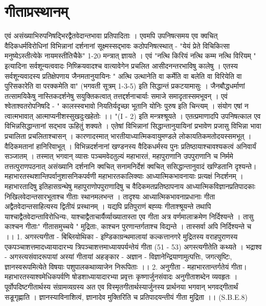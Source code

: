 \chapter{गीताप्रस्थानम् }
एवं असंख्याभिरुपनिषद्भिरद्वैतवेदान्तभावा प्रतिपादिताः । एवमपि उपनिषत्समय एव क्वचित् वैदिकधर्मविरोधिनां विभिन्नानां दर्शनानां सूक्ष्मस्सद्भावः कठोपनिषत्स्थात् - "येयं प्रेते विचिकित्सा मनुष्येऽस्तीत्येके नायमस्तीतिचैके" 1-20 मन्त्रात् ज्ञायते । एवं "नत्थि किरियं नत्थि कम्म नत्थि विरियम् " इत्यादिना सर्वशून्यत्ववादः निष्क्रियवादश्च वात्यावेगेन प्रचलित आसीदनन्तरभाविषु कालेषु । एतस्य सर्वशून्यवादस्य प्रतिक्षेपणाय जैनमतानुयायिनः " अत्थि उत्थानेति वा कर्मेति वा बलेति वा विरियेति वा पुरिसकारेति वा परक्कमेति वा" (भगवती सूत्रम् 1-3-5) इति सिद्धान्तं प्रकटयामासुः । जैनबौद्धधर्माणां तत्सामयिकेेषु नास्तिकदर्शनेषु सयुक्तिकत्वात् तत्तद्दर्शनाचार्याः समाजे समादृतास्समभूवन् । एवं श्वेताश्वतरोपनिषदि - 
" कालस्स्वभावो नियतिर्यदृच्छा भूतानि योनिः पुरुष इति चिन्त्यम् ।
संयोग एषां न त्वात्मभावात् आत्माप्यनीशस्सुखदुःखहेतोः ।। "(I - 2)
इति मन्त्रश्श्रूयते । एतत्प्रमाणादपि उपनिषत्काल एव विभिन्नसिद्धान्तानां सद्भाव ऊहितुं शक्यते । एतेषां विभिन्नानां सिद्धान्तानुयायिनां प्रभावेण प्रजासु विभिन्ना भावा प्रचालिता प्रचलिताश्चासन् । कारणादस्मात् भारतीयाध्यात्मिकवायुमण्डले लोकायतिकमतोदयस्समभूत् । वैदिकमतानां हानिरिवाभूत् । विभिन्नदर्शनानां खण्डनस्य वैदिकधर्मस्य पुनः प्रतिष्ठायाश्चावश्यकत्वं अनिवार्यं सञ्जातम् । तस्मात् भगवान् व्यासः पञ्चमवेदतुल्यं महाभारतं, महापुराणानि उपपुराणानि च निर्ममे तत्तत्पुराणपठनात् असंख्यानि दर्शनानि क्वचित् सनामनिर्देशं क्वचित् ससिद्धान्तानुवादं खण्डितानि दृश्यन्ते। महाभारतस्थशान्तिपर्वानुशासनिकपर्वणी महाभारतकालिक्याः आध्यात्मिकभावनायाः प्रत्यक्षं निदर्शनम् । महाभारतादिषु इतिहासग्रन्थेषु महापुराणोपपुराणादिषु च वैदिकमतप्रतिष्ठापनाय आध्यात्मिकविज्ञानप्रतिपादकाः निखिलवेदान्तसारभूताश्च गीताः स्थानमलभन्त । तादृश्यः आध्यात्मिकभावनाप्रधानाः गीता अद्वैतवेदान्तसाहित्यस्य द्वितीयं प्रस्थानम् । यद्यपि प्रतिपुराणं बह्व्यः गीताश्श्रूयन्ते तथापि याश्चाद्वैतवेदान्ताविरोधिन्यः, याश्चाद्वैताचार्यैर्व्याख्यातास्ता एव गीता अत्र वर्णमालाक्रमेण निर्दिश्यन्ते । तासु काश्चन गीताः" गीतासमुच्चये " मुद्रिताः, काश्चन पुरणान्तर्गताश्च विद्यन्ते । तास्सर्वा अपि निर्दिश्यन्ते च ।। 
1. अगस्त्यगीता - 
बिब्लियोथिका - इण्डिकाग्रन्थमालायां कल्कत्तानगरे मुद्रितस्य वराहपुराणस्य एकपञ्चाशत्तमादध्यायादारभ्य त्रिपञ्चाशत्तमाध्यायपर्यन्तेयं गीता (51 - 53) अगस्त्यगीतेति कथ्यते । 
भद्राश्व - अगस्त्यसंवादरूपायां अस्यां गीतायां अहङ्कार - अज्ञान - विज्ञानेन्द्रियाणामुत्पत्तिः, जगत्सृष्टिः, ज्ञानस्वरूपमित्येते विषयाः पशुपालकथाव्याजेन निरूपिताः ।। 
2. अनुगीता -
महाभारतान्तर्गतेयं गीता। महाभारतस्याश्वमेधिकपर्वणि षोडशाध्यायादारभ्या प्रवृत्तः कृष्णार्जुनसंवादः अनुगीताशब्देन व्यवहृतः । पूर्वोपदिष्टगीतार्थस्य संग्रामव्यग्रस्य अत एव विस्मृतगीतार्थस्यार्जुनस्य प्रार्थनया भगवान् भगवद्गीतार्थं सङूगृह्णाति । ज्ञानस्याविनाशित्वं, ज्ञानादेव मुक्तिरिति च प्रतिपादयन्तीयं गीता मुद्रिता ।। (S.B.E.8) 
